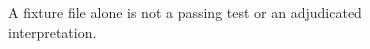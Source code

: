 \begin{figure}[H]
\centering
{}
\caption{A fixture file alone is not a passing test or an adjudicated interpretation.}\label{fig:teach-P-05-evidence-01}
\end{figure}
